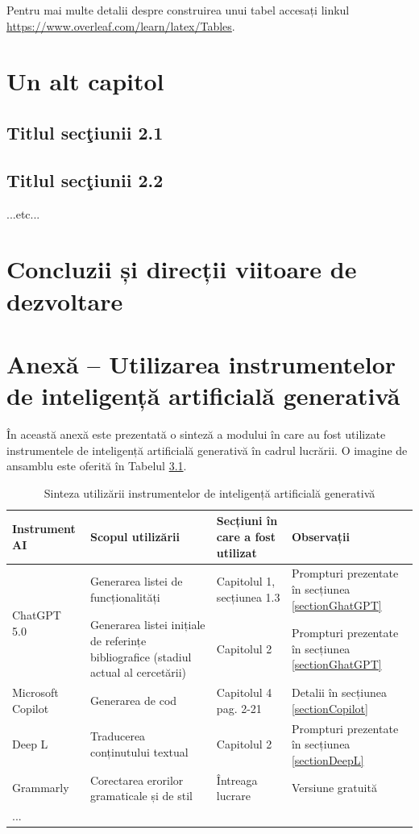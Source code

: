 \documentclass[12pt,a4paper]{report}
\theoremstyle{definition}
\theoremstyle{remark}
\begin{document}
Pentru mai multe detalii despre construirea unui tabel accesați linkul \url{https://www.overleaf.com/learn/latex/Tables}.

\chapter{Un alt capitol}
\section{Titlul sec\c tiunii 2.1}
\section{Titlul sec\c tiunii 2.2}
...etc...
\chapter{Concluzii și direcții viitoare de dezvoltare}




\appendix
\chapter{Anexă – Utilizarea instrumentelor de inteligență artificială generativă}
\label{genAIUsage}
În această anexă este prezentată o sinteză a modului în care au fost utilizate instrumentele de inteligență artificială generativă în cadrul lucrării. O imagine de ansamblu este oferită în Tabelul \ref{tab:genAIOverview}.

\begin{table}[h!]
    \centering
    \begin{tabularx}{\textwidth}{|l|X|X|X|}
            \hline \rowcolor{blue!20}
         Instrument AI& Scopul utilizării & Secțiuni în care a fost utilizat & Observații \\\hline
         \multirow{2}{*}{ChatGPT 5.0} & Generarea listei de funcționalități & Capitolul 1, secțiunea 1.3& Prompturi prezentate în secțiunea \ref{sectionGhatGPT}\\ \cline{2-4}
          
          & Generarea listei inițiale de referințe bibliografice (stadiul actual al cercetării) & Capitolul 2 & Prompturi prezentate în secțiunea \ref{sectionGhatGPT}\\ \hline
         
         Microsoft Copilot & Generarea de cod & Capitolul 4 pag. 2-21  & Detalii în secțiunea \ref{sectionCopilot}\\ \hline
         Deep L &  Traducerea conținutului textual & Capitolul 2 & Prompturi prezentate în secțiunea \ref{sectionDeepL} \\ \hline
         Grammarly & Corectarea erorilor gramaticale și de stil & Întreaga lucrare & Versiune gratuită\\ \hline
         ... &  & & \\\hline
    \end{tabularx}
    \caption{Sinteza utilizării instrumentelor de inteligență artificială generativă}
    \label{tab:genAIOverview}
\end{table}
\end{document}
